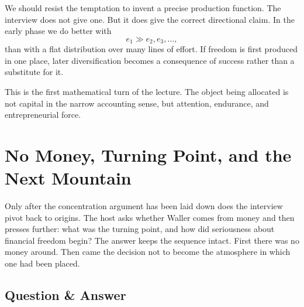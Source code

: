 \begin{figure}[h]
\centering
{}
\end{figure}

We should resist the temptation to invent a precise production function. The interview does not give one. But it does give the correct directional claim. In the early phase we do better with
\[
e_1 \gg e_2,e_3,\dots,
\]
than with a flat distribution over many lines of effort. If freedom is first produced in one place, later diversification becomes a consequence of success rather than a substitute for it.

\begin{remark}
This is the first mathematical turn of the lecture. The object being allocated is not capital in the narrow accounting sense, but attention, endurance, and entrepreneurial force.
\end{remark}

\section{No Money, Turning Point, and the Next Mountain}

Only after the concentration argument has been laid down does the interview pivot back to origins. The host asks whether Waller comes from money and then presses further: what was the turning point, and how did seriousness about financial freedom begin? The answer keeps the sequence intact. First there was no money around. Then came the decision not to become the atmosphere in which one had been placed.

\subsection{Question \& Answer}


